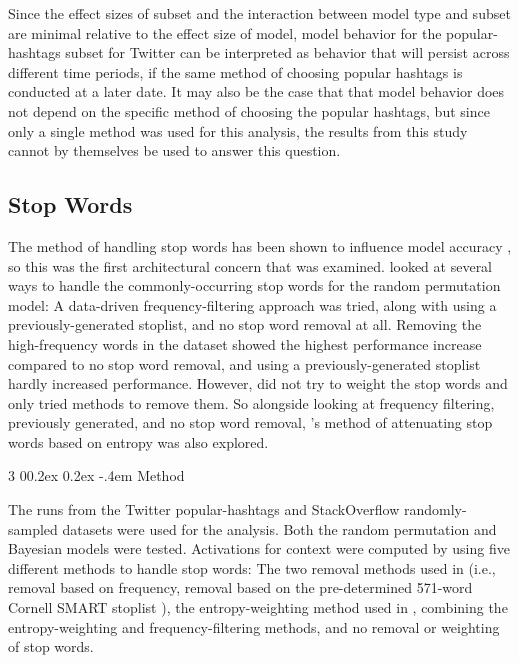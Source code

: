 \documentclass[man,floatsintext,donotrepeattitle]{apa6}
\makeatletter
\renewcommand{\subsubsection}{%
  \@startsection
  {subsubsection}%
  {3}%
  {\parindent}%
  {0\baselineskip \@plus 0.2ex \@minus 0.2ex}%
  {-.4em}%
  {\normalfont\normalsize\bfseries\addperi}}
\makeatother
\begin{document}
Since the effect sizes of subset and the interaction between model type and subset are minimal relative to the effect size of model,
model behavior for the popular-hashtags subset for Twitter can be interpreted as behavior that will persist across different time periods,
if the same method of choosing popular hashtags is conducted at a later date.
It may also be the case that that model behavior does not depend on the specific method of choosing the popular hashtags, but since only a single method was used for this analysis,
the results from this study cannot by themselves be used to answer this question.

\subsection{Stop Words}

The method of handling stop words has been shown to influence model accuracy \parencite{Sahlgren2008,Stanley2013}, so this was the first architectural concern that was examined.
\textcite{Sahlgren2008} looked at several ways to handle the commonly-occurring stop words for the random permutation model:
A data-driven frequency-filtering approach was tried, along with using a previously-generated stoplist, and no stop word removal at all.
Removing the high-frequency words in the dataset showed the highest performance increase compared to no stop word removal, and using a previously-generated stoplist hardly increased performance.
However, \citeauthor{Sahlgren2008} did not try to weight the stop words and only tried methods to remove them.
So alongside looking at frequency filtering, previously generated, and no stop word removal, \textcite{Stanley2013}'s method of attenuating stop words based on entropy was also explored.

\subsubsection{Method}

The runs from the Twitter popular-hashtags and StackOverflow randomly-sampled datasets were used for the analysis.
Both the random permutation and Bayesian models were tested.
Activations for context were computed by using five different methods to handle stop words:
The two removal methods used in \textcite{Sahlgren2008}
(i.e., removal based on frequency, removal based on the pre-determined 571-word Cornell SMART stoplist \parencite{Salton1988}),
the entropy-weighting method used in \textcite{Stanley2013},
combining the entropy-weighting and frequency-filtering methods,
and no removal or weighting of stop words.
\end{document}
